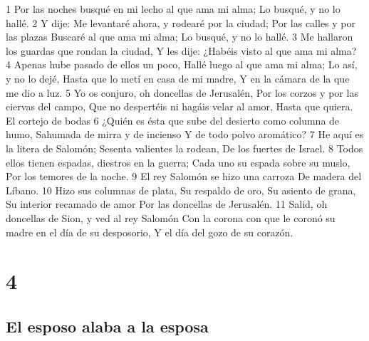 1 Por las noches busqué en mi lecho al que ama mi alma;
Lo busqué, y no lo hallé.
2 Y dije: Me levantaré ahora, y rodearé por la ciudad;
Por las calles y por las plazas
Buscaré al que ama mi alma; 
Lo busqué, y no lo hallé.
3 Me hallaron los guardas que rondan la ciudad,
Y les dije: ¿Habéis visto al que ama mi alma?
4 Apenas hube pasado de ellos un poco,
Hallé luego al que ama mi alma;
Lo así, y no lo dejé,
Hasta que lo metí en casa de mi madre,
Y en la cámara de la que me dio a luz.
5 Yo os conjuro, oh doncellas de Jerusalén,
Por los corzos y por las ciervas del campo,
Que no despertéis ni hagáis velar al amor,
Hasta que quiera.
El cortejo de bodas 
6 ¿Quién es ésta que sube del desierto como columna de humo,
Sahumada de mirra y de incienso
Y de todo polvo aromático?
7 He aquí es la litera de Salomón;
Sesenta valientes la rodean,
De los fuertes de Israel.
8 Todos ellos tienen espadas, diestros en la guerra; 
Cada uno su espada sobre su muslo,
Por los temores de la noche.
9 El rey Salomón se hizo una carroza
De madera del Líbano.
10 Hizo sus columnas de plata,
Su respaldo de oro,
Su asiento de grana,
Su interior recamado de amor
Por las doncellas de Jerusalén.
11 Salid, oh doncellas de Sion, y ved al rey Salomón
Con la corona con que le coronó su madre en el día de su desposorio,
Y el día del gozo de su corazón. 

\chapter{4}

\section*{El esposo alaba a la esposa}

